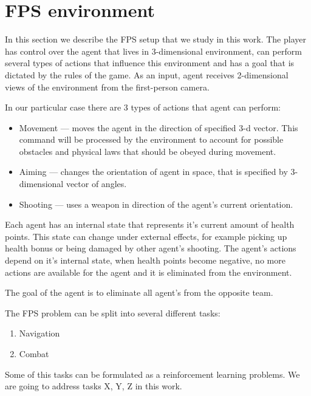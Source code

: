 \section{FPS environment}
In this section we describe the FPS setup that we study in this work.
The player has control over the agent that lives in 3-dimensional environment, can perform several types of actions that influence this environment and has a goal that is dictated by the rules of the game.
As an input, agent receives 2-dimensional views of the environment from the first-person camera.

In our particular case there are 3 types of actions that agent can perform:
\begin{itemize}
    \item Movement --- moves the agent in the direction of specified 3-d vector. This command will be processed by the environment to account for possible obstacles and physical laws that should be obeyed during movement.
    \item Aiming --- changes the orientation of agent in space, that is specified by 3-dimensional vector of angles.
    \item Shooting --- uses a weapon in direction of the agent's current orientation.
\end{itemize}

Each agent has an internal state that represents it's current amount of health points. This state can change under external effects, for example picking up health bonus or being damaged by other agent's shooting.
The agent's actions depend on it's internal state, when health points become negative, no more actions are available for the agent and it is eliminated from the environment.

The goal of the agent is to eliminate all agent's from the opposite team.

The FPS problem can be split into several different tasks:
\begin{enumerate}
    \item Navigation
    \item Combat
\end{enumerate}

Some of this tasks can be formulated as a reinforcement learning problems.
We are going to address tasks X, Y, Z in this work.

